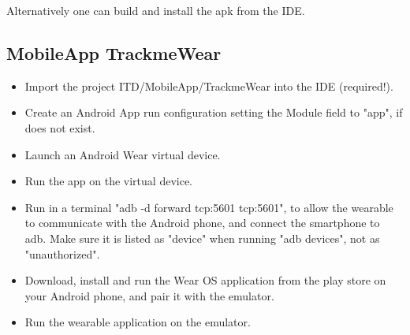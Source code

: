 \documentclass[../main.tex]{subfiles}
\begin{document}
Alternatively one can build and install the apk from the IDE.

\subsection{MobileApp TrackmeWear}

\begin{itemize}
	\item Import the project ITD/MobileApp/TrackmeWear into the IDE (required!).
	\item Create an Android App run configuration setting the Module field to "app", if does not exist.
	\item Launch an Android Wear virtual device.
	\item Run the app on the virtual device.
	\item Run in a terminal "adb -d forward tcp:5601 tcp:5601", to allow the wearable to communicate with the Android phone, and connect the smartphone to adb. Make sure it is listed as "device" when running "adb devices", not as "unauthorized".
	\item Download, install and run the Wear OS application from the play store on your Android phone, and pair it with the emulator.
	\item Run the wearable application on the emulator.
\end{itemize}
\end{document}
